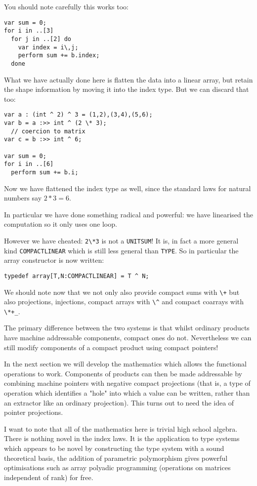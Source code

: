 \documentclass{article}
\begin{document}
You should note carefully this works too:
\begin{verbatim}
var sum = 0;
for i in ..[3]
  for j in ..[2] do
    var index = i\,j;
    perform sum += b.index;
  done
\end{verbatim}

What we have actually done here is flatten the data into a linear array, but retain the
shape information by moving it into the index type. But we can discard that too:

\begin{verbatim}
var a : (int ^ 2) ^ 3 = (1,2),(3,4),(5,6);
var b = a :>> int ^ (2 \* 3);
  // coercion to matrix
var c = b :>> int ^ 6;

var sum = 0;
for i in ..[6]
  perform sum += b.i;
\end{verbatim}

Now we have flattened the index type as well, since the standard laws for
natural numbers say $2 * 3 = 6$.

In particular we have done something radical and powerful: we have linearised
the computation so it only uses one loop.

However we have cheated: \verb$2\*3$ is not a \verb$UNITSUM$! It is, in fact
a more general kind \verb$COMPACTLINEAR$ which is still less general than
\verb$TYPE$. So in particular the array constructor is now written:
\begin{verbatim}
typedef array[T,N:COMPACTLINEAR] = T ^ N;
\end{verbatim}

We should note now that we not only also provide compact sums with \verb$\+$
but also projections, injections, compact arrays with \verb$\^$ and 
compact coarrays with \verb$\*+_$. 

The primary difference between the two systems is that whilst ordinary products
have machine addressable components, compact ones do not. Nevertheless we can
still modify components of a compact product using compact pointers!

In the next section we will develop the mathematics which allows the functional
operations to work. Components of products can then be made addressable
by combining machine pointers with negative compact projections (that is,
a type of operation which identifies a "hole" into which a value can be written,
rather than an extractor like an ordinary projection). This turns out
to need the idea of pointer projections.

I want to note that all of the mathematics here is trivial high school
algebra. There is nothing novel in the index laws. It is the application
to type systems which appears to be novel by constructing the type
system with a sound theoretical basis, the addition of parametric
polymorphism gives powerful optimisations such as array polyadic
programming (operations on matrices independent of rank) for free.
\end{document}
